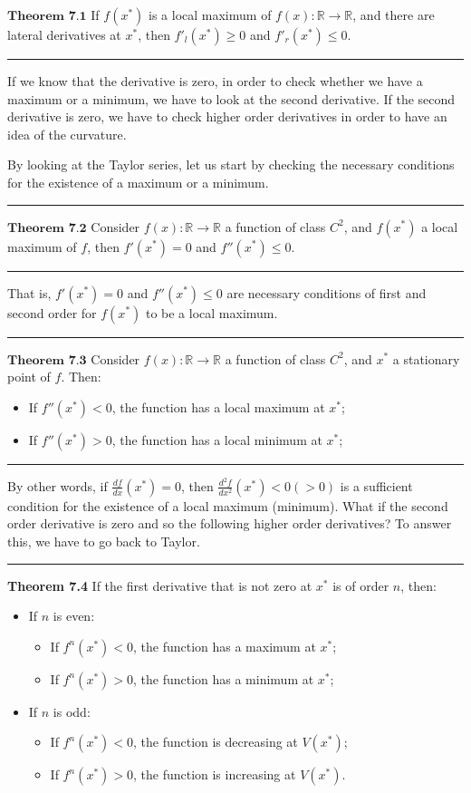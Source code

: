 \documentclass[0pt, a4paper]{article}
\begin{document}
$\textbf{Theorem 7.1}$ If $f(x^*)$ is a local maximum of $f(x):\mathbb{R}\to\mathbb{R}$, and there are lateral derivatives at $x^*$, then $f'_l(x^*)\geq0$ and $f'_r(x^*)\leq0$.

\noindent\rule{\textwidth}{1pt}

If we know that the derivative is zero, in order to check whether we have a maximum or a minimum, we have to look at the second derivative. If the second derivative is zero, we have to check higher order derivatives in order to have an idea of the curvature.

By looking at the Taylor series, let us start by checking the necessary conditions for the existence of a maximum or a minimum.

\noindent\rule{\textwidth}{1pt}

$\textbf{Theorem 7.2}$ Consider $f(x):\mathbb{R}\to\mathbb{R}$ a function of class $C^2$, and $f(x^*)$ a local maximum of $f$, then $f'(x^*)=0$ and $f''(x^*)\leq0$.

\noindent\rule{\textwidth}{1pt}

That is, $f'(x^*)=0$ and $f''(x^*)\leq0$ are necessary conditions of first and second order for $f(x^*)$ to be a local maximum.

\noindent\rule{\textwidth}{1pt}

$\textbf{Theorem 7.3}$ Consider $f(x):\mathbb{R}\to\mathbb{R}$ a function of class $C^2$, and $x^*$ a stationary point of $f$. Then:
\begin{itemize}
	\item If $f''(x^*)<0$, the function has a local maximum at $x^*$;
	\item If $f''(x^*)>0$, the function has a local minimum at $x^*$;
\end{itemize} 

\noindent\rule{\textwidth}{1pt}

By other words, if $\frac{df}{dx}(x^*)=0$, then $\frac{d^2 f}{dx^2}(x^*)<0(>0)$ is a sufficient condition for the existence of a local maximum (minimum). What if the second order derivative is zero and so the following higher order derivatives? To answer this, we have to go back to Taylor.

\noindent\rule{\textwidth}{1pt}

\textbf{Theorem 7.4} If the first derivative that is not zero at $x^*$ is of order $n$, then:
\begin{itemize}
	\item If $n$ is even:
	\begin{itemize}
		\item If $f^n(x^*)<0$, the function has a maximum at $x^*$;
		\item If $f^n(x^*)>0$, the function has a minimum at $x^*$;		
	\end{itemize}
	\item If $n$ is odd:
	\begin{itemize}
		\item If $f^n(x^*)<0$, the function is decreasing at $V(x^*)$;
		\item If $f^n(x^*)>0$, the function is increasing at $V(x^*)$.
	\end{itemize}
\end{itemize}
\end{document}
